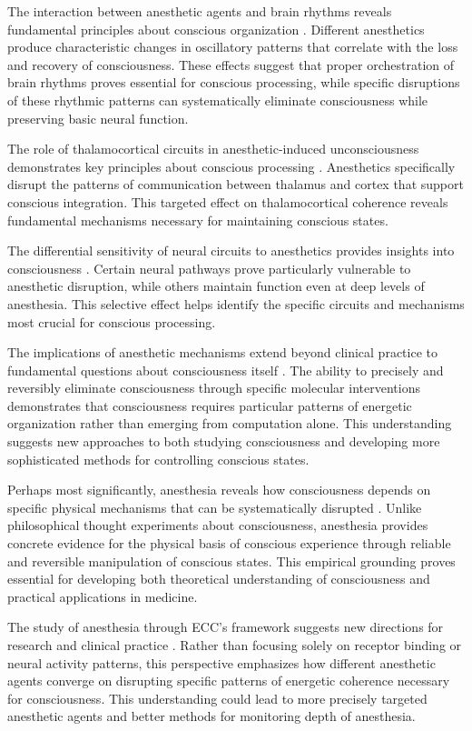 The interaction between anesthetic agents and brain rhythms reveals fundamental principles about conscious organization \cite{Steriade2003}. Different anesthetics produce characteristic changes in oscillatory patterns that correlate with the loss and recovery of consciousness. These effects suggest that proper orchestration of brain rhythms proves essential for conscious processing, while specific disruptions of these rhythmic patterns can systematically eliminate consciousness while preserving basic neural function.

The role of thalamocortical circuits in anesthetic-induced unconsciousness demonstrates key principles about conscious processing \cite{Mashour2017}. Anesthetics specifically disrupt the patterns of communication between thalamus and cortex that support conscious integration. This targeted effect on thalamocortical coherence reveals fundamental mechanisms necessary for maintaining conscious states.

The differential sensitivity of neural circuits to anesthetics provides insights into consciousness \cite{Tonner2017}. Certain neural pathways prove particularly vulnerable to anesthetic disruption, while others maintain function even at deep levels of anesthesia. This selective effect helps identify the specific circuits and mechanisms most crucial for conscious processing.

The implications of anesthetic mechanisms extend beyond clinical practice to fundamental questions about consciousness itself \cite{Alkire2008}. The ability to precisely and reversibly eliminate consciousness through specific molecular interventions demonstrates that consciousness requires particular patterns of energetic organization rather than emerging from computation alone. This understanding suggests new approaches to both studying consciousness and developing more sophisticated methods for controlling conscious states.

Perhaps most significantly, anesthesia reveals how consciousness depends on specific physical mechanisms that can be systematically disrupted \cite{Brown2010}. Unlike philosophical thought experiments about consciousness, anesthesia provides concrete evidence for the physical basis of conscious experience through reliable and reversible manipulation of conscious states. This empirical grounding proves essential for developing both theoretical understanding of consciousness and practical applications in medicine.

The study of anesthesia through ECC's framework suggests new directions for research and clinical practice \cite{Franks2008}. Rather than focusing solely on receptor binding or neural activity patterns, this perspective emphasizes how different anesthetic agents converge on disrupting specific patterns of energetic coherence necessary for consciousness. This understanding could lead to more precisely targeted anesthetic agents and better methods for monitoring depth of anesthesia.

